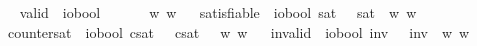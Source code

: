 \begin{isabellebody}
\isamarkuptrue%
\ \isamarkupfalse%
\ valid\ {\isacharcolon}{\isacharcolon}\ {\isachardoublequoteopen}io{\isasymRightarrow}bool{\isachardoublequoteclose}\ {\isacharparenleft}{\isachardoublequoteopen}{\isasymlfloor}{\isacharunderscore}{\isasymrfloor}{\isachardoublequoteclose}\ {\isacharbrackleft}{}{\isacharbrackright}{\isacharparenright}\ \ {\isachardoublequoteopen}{\isasymlfloor}{\isasympsi}{\isasymrfloor}\ {\isasymequiv}\ \ {\isasymforall}w{\isachardot}{\isacharparenleft}{\isasympsi}\ w{\isacharparenright}{\isachardoublequoteclose}\isanewline
\ \isamarkupfalse%
\ satisfiable\ {\isacharcolon}{\isacharcolon}\ {\isachardoublequoteopen}io{\isasymRightarrow}bool{\isachardoublequoteclose}\ {\isacharparenleft}{\isachardoublequoteopen}{\isasymlfloor}{\isacharunderscore}{\isasymrfloor}\isactrlsup s\isactrlsup a\isactrlsup t{\isachardoublequoteclose}\ {\isacharbrackleft}{}{\isacharbrackright}{\isacharparenright}\ \ {\isachardoublequoteopen}{\isasymlfloor}{\isasympsi}{\isasymrfloor}\isactrlsup s\isactrlsup a\isactrlsup t\ {\isasymequiv}\ {\isasymexists}w{\isachardot}{\isacharparenleft}{\isasympsi}\ w{\isacharparenright}{\isachardoublequoteclose}\isanewline
\ \isamarkupfalse%
\ countersat\ {\isacharcolon}{\isacharcolon}\ {\isachardoublequoteopen}io{\isasymRightarrow}bool{\isachardoublequoteclose}\ {\isacharparenleft}{\isachardoublequoteopen}{\isasymlfloor}{\isacharunderscore}{\isasymrfloor}\isactrlsup c\isactrlsup s\isactrlsup a\isactrlsup t{\isachardoublequoteclose}\ {\isacharbrackleft}{}{\isacharbrackright}{\isacharparenright}\ \ {\isachardoublequoteopen}{\isasymlfloor}{\isasympsi}{\isasymrfloor}\isactrlsup c\isactrlsup s\isactrlsup a\isactrlsup t\ {\isasymequiv}\ \ {\isasymexists}w{\isachardot}{\isasymnot}{\isacharparenleft}{\isasympsi}\ w{\isacharparenright}{\isachardoublequoteclose}\isanewline
\ \isamarkupfalse%
\ invalid\ {\isacharcolon}{\isacharcolon}\ {\isachardoublequoteopen}io{\isasymRightarrow}bool{\isachardoublequoteclose}\ {\isacharparenleft}{\isachardoublequoteopen}{\isasymlfloor}{\isacharunderscore}{\isasymrfloor}\isactrlsup i\isactrlsup n\isactrlsup v{\isachardoublequoteclose}\ {\isacharbrackleft}{}{\isacharbrackright}{\isacharparenright}\ \ {\isachardoublequoteopen}{\isasymlfloor}{\isasympsi}{\isasymrfloor}\isactrlsup i\isactrlsup n\isactrlsup v\ {\isasymequiv}\ {\isasymforall}w{\isachardot}{\isasymnot}{\isacharparenleft}{\isasympsi}\ w{\isacharparenright}{\isachardoublequoteclose}%

\end{isabellebody}
